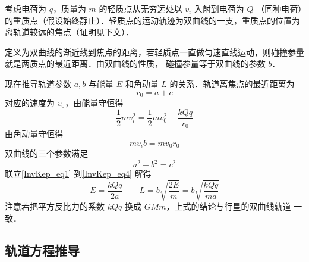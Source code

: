 

考虑电荷为 $q$，质量为 $m$ 的轻质点从无穷远处以 $v_i$ 入射到电荷为 $Q$ （同种电荷）的重质点（假设始终静止）．轻质点的运动轨迹为双曲线的一支，重质点的位置为离轨道较远的焦点（证明见下文）．

定义为双曲线的渐近线到焦点的距离，若轻质点一直做匀速直线运动，则碰撞参量就是两质点的最近距离．由双曲线的性质，%
碰撞参量等于双曲线的参数 $b$．

现在推导轨道参数 $a,b$ 与能量 $E$ 和角动量 $L$ 的关系．轨道离焦点的最近距离为
\begin{equation}\label{InvKep_eq1}
r_0 = a+c
\end{equation}
对应的速度为 $v_0$，由能量守恒得
\begin{equation}
\frac12 mv_i^2 = \frac12 mv_0^2 + \frac{kQq}{r_0}
\end{equation}
由角动量守恒得
\begin{equation}
m v_i b = m v_0 r_0
\end{equation}
双曲线的三个参数满足
\begin{equation}\label{InvKep_eq4}
a^2+b^2=c^2
\end{equation}
联立\autoref{InvKep_eq1} 到\autoref{InvKep_eq4} 解得
\begin{equation}
E = \frac{kQq}{2a} \qquad L = b\sqrt{\frac{2E}{m}} =b\sqrt{\frac{kQq}{ma}}
\end{equation}
注意若把平方反比力的系数 $kQq$ 换成 $GMm$，上式的结论与行星的双曲线轨道%
一致．

\subsection{轨道方程推导}
